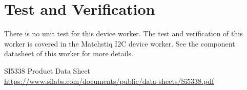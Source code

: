 \documentclass{article}
\def\Comp{SI5338}
\begin{document}
\section*{Test and Verification}
There is no unit test for this device worker. The test and verification of this worker is covered in the Matchstiq I2C device worker. See the component datasheet of this worker for more details.
  \begin{thebibliography}{1}

   \Comp{} Product Data Sheet\\
  \url{https://www.silabs.com/documents/public/data-sheets/Si5338.pdf}

  \end{thebibliography}
\end{document}
